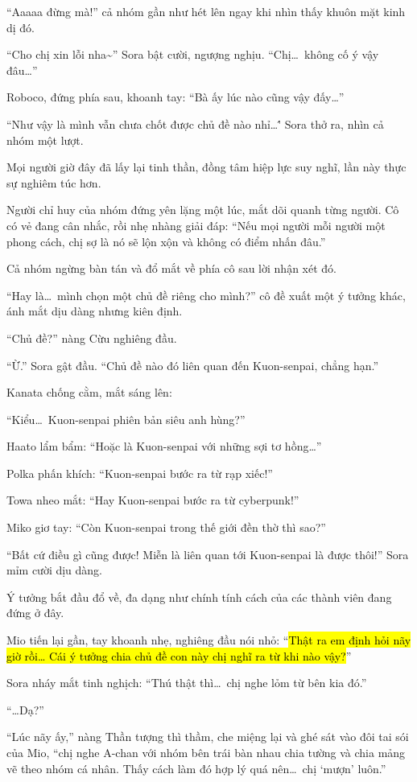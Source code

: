 \documentclass[../main.tex]{subfiles}
\begin{document}
``Aaaaa đừng mà!'' cả nhóm gần như hét lên ngay khi nhìn thấy khuôn mặt kinh dị đó.

``Cho chị xin lỗi nha\~{}'' Sora bật cười, ngượng nghịu. ``Chị\dots\ không cố ý vậy đâu\dots''

Roboco, đứng phía sau, khoanh tay: ``Bà ấy lúc nào cũng vậy đấy\dots''

``Như vậy là mình vẫn chưa chốt được chủ đề nào nhỉ\dots\'' Sora thở ra, nhìn cả nhóm một lượt.

Mọi người giờ đây đã lấy lại tinh thần, đồng tâm hiệp lực suy nghĩ, lần này thực sự nghiêm túc hơn.

Người chỉ huy của nhóm đứng yên lặng một lúc, mắt dõi quanh từng người. Cô có vẻ đang cân nhắc, rồi nhẹ nhàng giải đáp: ``Nếu mọi người mỗi người một phong cách, chị sợ là nó sẽ lộn xộn và không có điểm nhấn đâu.''

Cả nhóm ngừng bàn tán và đổ mắt về phía cô sau lời nhận xét đó.

``Hay là\dots\ mình chọn một chủ đề riêng cho mình?'' cô đề xuất một ý tưởng khác, ánh mắt dịu dàng nhưng kiên định.

``Chủ đề?'' nàng Cừu nghiêng đầu.

``Ừ.'' Sora gật đầu. ``Chủ đề nào đó liên quan đến Kuon-senpai, chẳng hạn.''

Kanata chống cằm, mắt sáng lên:

``Kiểu\dots\ Kuon-senpai phiên bản siêu anh hùng?''

Haato lẩm bẩm: ``Hoặc là Kuon-senpai với những sợi tơ hồng\dots''

Polka phấn khích: ``Kuon-senpai bước ra từ rạp xiếc!''

Towa nheo mắt: ``Hay Kuon-senpai bước ra từ cyberpunk!''

Miko giơ tay: ``Còn Kuon-senpai trong thế giới đền thờ thì sao?''

``Bất cứ điều gì cũng được! Miễn là liên quan tới Kuon-senpai là được thôi!'' Sora mỉm cười dịu dàng.

Ý tưởng bắt đầu đổ về, đa dạng như chính tính cách của các thành viên đang đứng ở đây.

Mio tiến lại gần, tay khoanh nhẹ, nghiêng đầu nói nhỏ: ``\hl{Thật ra em định hỏi nãy giờ rồi\dots{} Cái ý tưởng chia chủ đề con này chị nghĩ ra từ khi nào vậy?}''

Sora nháy mắt tinh nghịch: ``Thú thật thì\dots\ chị nghe lỏm từ bên kia đó.''

``\dots Dạ?''

``Lúc nãy ấy,'' nàng Thần tượng thì thầm, che miệng lại và ghé sát vào đôi tai sói của Mio, ``chị nghe A-chan với nhóm bên trái bàn nhau chia tường và chia mảng vẽ theo nhóm cá nhân. Thấy cách làm đó hợp lý quá nên\dots\ chị `mượn' luôn.''
\end{document}
